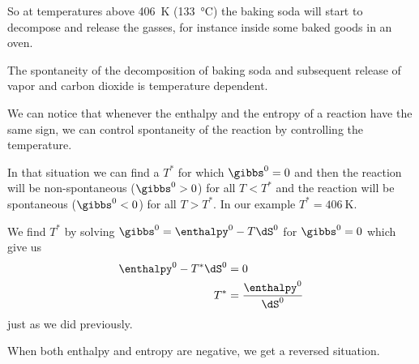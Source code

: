 \documentclass[../mit-general-chemistry.tex]{subfiles}
\begin{document}
So at temperatures above \SI{406}{\kelvin} (\SI{133}{\celsius}) the
baking soda will start to decompose and release the gasses, for
instance inside some baked goods in an oven.




\begin{hfigure}
  \begin{center}
  \end{center}
  \caption{The spontaneity of the decomposition of baking soda and
    subsequent release of vapor and carbon dioxide is temperature
    dependent.}
\end{hfigure}


We can notice that whenever the enthalpy and the entropy of a reaction
have the same sign, we can control spontaneity of the reaction by
controlling the temperature.

In that situation we can find a $T^*$ for which $\gibbs^0 = 0$ and
then the reaction will be non-spontaneous ($\gibbs^0 > 0$) for all $T
< T^*$ and the reaction will be spontaneous ($\gibbs^0 < 0$) for all
$T > T^*$. In our example $T^* = \SI{406}{\kelvin}$.

We find $T^*$ by solving $\gibbs^0 = \enthalpy^0 - T \dS^0$ for
$\gibbs^0 = 0$ which give us
\begin{align*}
  \enthalpy^0 - T^* \dS^0 &= 0 \\
  T^* &= \frac{\enthalpy^0}{\dS^0} \\  
\end{align*}
just as we did previously.



When both enthalpy and entropy are negative, we get a reversed
situation.
\end{document}
